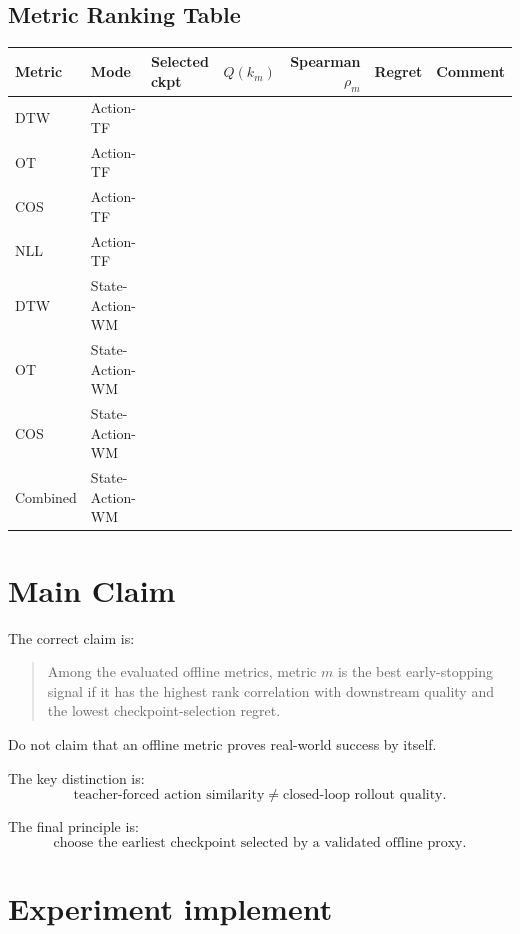 \documentclass[11pt]{article}
\begin{document}
\subsection*{Metric Ranking Table}

\begin{center}
\begin{tabular}{llllrrr}
\toprule
Metric & Mode & Selected ckpt & $Q(k_m)$ & Spearman $\rho_m$ & Regret & Comment \\
\midrule
DTW & Action-TF & & & & & \\
OT & Action-TF & & & & & \\
COS & Action-TF & & & & & \\
NLL & Action-TF & & & & & \\
DTW & State-Action-WM & & & & & \\
OT & State-Action-WM & & & & & \\
COS & State-Action-WM & & & & & \\
Combined & State-Action-WM & & & & & \\
\bottomrule
\end{tabular}
\end{center}

\section{Main Claim}

The correct claim is:
\begin{quote}
Among the evaluated offline metrics, metric $m$ is the best early-stopping signal if it has the highest rank correlation with downstream quality and the lowest checkpoint-selection regret.
\end{quote}

Do not claim that an offline metric proves real-world success by itself.

The key distinction is:
\begin{equation}
\boxed{\text{teacher-forced action similarity} \neq \text{closed-loop rollout quality}.}
\end{equation}

The final principle is:
\begin{equation}
\boxed{\text{choose the earliest checkpoint selected by a validated offline proxy}.}
\end{equation}


\section{Experiment implement}
\end{document}
